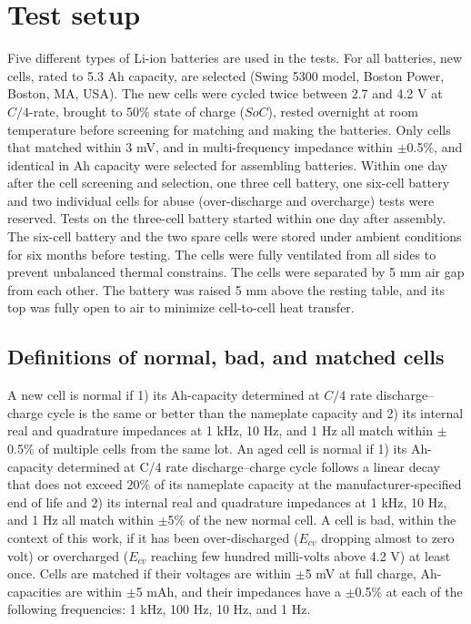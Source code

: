 \section{Test setup}

\hspace{0.5cm} 
Five different types of Li-ion batteries are used in the tests. For all batteries, new cells, rated to 5.3 Ah capacity,  are selected (Swing 5300 model, Boston Power, Boston, MA, USA). The new cells were cycled twice between 2.7 and 4.2 V at $C/4$-rate, brought to 50\% state of charge ($SoC$), rested overnight at room temperature before screening for matching and making the batteries. Only cells that matched within 3 mV, and in multi-frequency impedance within $\pm$0.5\%, and identical in Ah capacity were selected for assembling batteries. Within one day after the cell screening and selection, one three cell battery, one six-cell battery and two individual cells for abuse (over-discharge and overcharge) tests were reserved. Tests on the three-cell battery started within one day after assembly. The six-cell battery and the two spare cells were stored under ambient conditions for six months before testing. The cells were fully ventilated from all sides to prevent unbalanced thermal constrains. The cells were separated by 5 mm air gap from each other. The battery was raised 5 mm above the resting table, and its top was fully open to air to minimize cell-to-cell heat transfer. 

\subsection{Definitions of normal, bad, and matched cells}

\hspace{0.5cm} 
A new cell is normal if 1) its Ah-capacity determined at $C/4$ rate discharge–charge cycle is the same or better than the nameplate capacity and 2) its internal real and quadrature impedances at 1 kHz, 10 Hz, and 1 Hz all match within $\pm$0.5\% of multiple cells from the same lot. An aged cell is normal if 1) its Ah-capacity determined at C/4 rate discharge–charge cycle follows a linear decay that does not exceed 20\% of its nameplate capacity at the manufacturer-specified end of life and 2) its internal real and quadrature impedances at 1 kHz, 10 Hz, and 1 Hz all match within $\pm$5\% of the new normal cell. A cell is bad, within the context of this work, if it has been over-discharged ($E_{cv}$ dropping almost to zero volt) or overcharged ($E_{cv}$ reaching few hundred milli-volts above 4.2 V) at least once. Cells are matched if their voltages are within $\pm$5 mV at full charge, Ah-capacities are within $\pm$5 mAh, and their impedances have a $\pm$0.5\% at each of the following frequencies: 1 kHz, 100 Hz, 10 Hz, and 1 Hz. 


